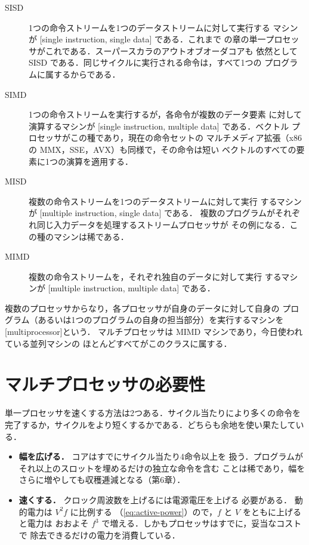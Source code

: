 \documentclass[../main.tex]{subfiles}
\begin{document}
\begin{description}
  \item[SISD] 1つの命令ストリームを1つのデータストリームに対して実行する
    マシンが [single instruction, single data] である．これまで
    の章の単一プロセッサがこれである．スーパースカラのアウトオブオーダコアも
    依然として SISD である．同じサイクルに実行される命令は，すべて1つの
    プログラムに属するからである．
  \item[SIMD] 1つの命令ストリームを実行するが，各命令が複数のデータ要素
    に対して演算するマシンが
    [single instruction, multiple data] である．ベクトル
    プロセッサがこの種であり，現在の命令セットの
    マルチメディア拡張（x86 の MMX，SSE，AVX）も同様で，その命令は短い
    ベクトルのすべての要素に1つの演算を適用する．
  \item[MISD] 複数の命令ストリームを1つのデータストリームに対して実行
    するマシンが [multiple instruction, single data] である．
    複数のプログラムがそれぞれ同じ入力データを処理するストリームプロセッサが
    その例になる．この種のマシンは稀である．
  \item[MIMD] 複数の命令ストリームを，それぞれ独自のデータに対して実行
    するマシンが [multiple instruction, multiple data] である．
\end{description}

複数のプロセッサからなり，各プロセッサが自身のデータに対して自身の
プログラム（あるいは1つのプログラムの自身の担当部分）を実行するマシンを
[multiprocessor]という．
マルチプロセッサは MIMD マシンであり，今日使われている並列マシンの
ほとんどすべてがこのクラスに属する．

\section{マルチプロセッサの必要性}
\label{sec:l18-why}

単一プロセッサを速くする方法は2つある．サイクル当たりにより多くの命令を
完了するか，サイクルをより短くするかである．どちらも余地を使い果たしている．
\begin{itemize}
  \item \textbf{幅を広げる．} コアはすでにサイクル当たり4命令以上を
    扱う．プログラムがそれ以上のスロットを埋めるだけの独立な命令を含む
    ことは稀であり，幅をさらに増やしても収穫逓減となる（第6章）．
  \item \textbf{速くする．} クロック周波数を上げるには電源電圧を上げる
    必要がある．%
    動的電力は $V^{2}f$ に比例する
    （\cref{eq:active-power}）ので，$f$ と $V$ をともに上げると電力は
    おおよそ $f^{3}$ で増える．しかもプロセッサはすでに，妥当なコストで
    除去できるだけの電力を消費している．
\end{itemize}
\end{document}
